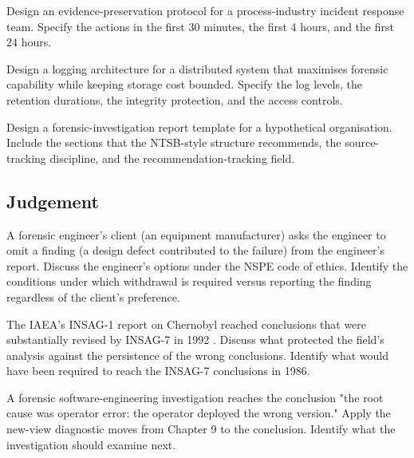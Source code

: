 \begin{exercise}
Design an evidence-preservation protocol for a process-industry incident response team. Specify the actions in the first 30 minutes, the first 4 hours, and the first 24 hours.
\end{exercise}

\begin{exercise}
Design a logging architecture for a distributed system that maximises forensic capability while keeping storage cost bounded. Specify the log levels, the retention durations, the integrity protection, and the access controls.
\end{exercise}

\begin{exercise}
Design a forensic-investigation report template for a hypothetical organisation. Include the sections that the NTSB-style structure recommends, the source-tracking discipline, and the recommendation-tracking field.
\end{exercise}

\subsection*{Judgement}

\begin{exercise}
A forensic engineer's client (an equipment manufacturer) asks the engineer to omit a finding (a design defect contributed to the failure) from the engineer's report. Discuss the engineer's options under the NSPE code of ethics. Identify the conditions under which withdrawal is required versus reporting the finding regardless of the client's preference.
\end{exercise}

\begin{exercise}
The IAEA's INSAG-1 report on Chernobyl \cite{acc:iaea-insag1-1986} reached conclusions that were substantially revised by INSAG-7 in 1992 \cite{acc:iaea-insag7-1992}. Discuss what protected the field's analysis against the persistence of the wrong conclusions. Identify what would have been required to reach the INSAG-7 conclusions in 1986.
\end{exercise}

\begin{exercise}
A forensic software-engineering investigation reaches the conclusion "the root cause was operator error: the operator deployed the wrong version." Apply the new-view diagnostic moves from Chapter 9 to the conclusion. Identify what the investigation should examine next.
\end{exercise}

